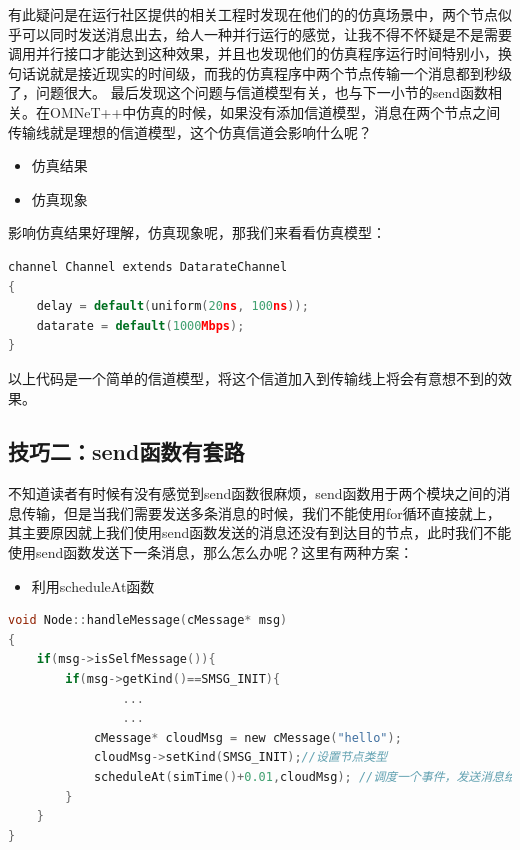 有此疑问是在运行社区提供的相关工程时发现在他们的的仿真场景中，两个节点似乎可以同时发送消息出去，给人一种并行运行的感觉，让我不得不怀疑是不是需要调用并行接口才能达到这种效果，并且也发现他们的仿真程序运行时间特别小，换句话说就是接近现实的时间级，而我的仿真程序中两个节点传输一个消息都到秒级了，问题很大。
最后发现这个问题与信道模型有关，也与下一小节的send函数相关。在OMNeT++中仿真的时候，如果没有添加信道模型，消息在两个节点之间传输线就是理想的信道模型，这个仿真信道会影响什么呢？

\begin{itemize}
\item 仿真结果

\item 仿真现象

\end{itemize}

影响仿真结果好理解，仿真现象呢，那我们来看看仿真模型：

\begin{lstlisting}[language=c]
channel Channel extends DatarateChannel
{
    delay = default(uniform(20ns, 100ns));
    datarate = default(1000Mbps);
}
\end{lstlisting}

以上代码是一个简单的信道模型，将这个信道加入到传输线上将会有意想不到的效果。

\subsection{技巧二：send函数有套路}
\label{技巧二：send函数有套路}

不知道读者有时候有没有感觉到send函数很麻烦，send函数用于两个模块之间的消息传输，但是当我们需要发送多条消息的时候，我们不能使用for循环直接就上，其主要原因就上我们使用send函数发送的消息还没有到达目的节点，此时我们不能使用send函数发送下一条消息，那么怎么办呢？这里有两种方案：

\begin{itemize}
\item 利用scheduleAt函数

\end{itemize}

\begin{lstlisting}[language=c]
void Node::handleMessage(cMessage* msg)
{
    if(msg->isSelfMessage()){
        if(msg->getKind()==SMSG_INIT){
                ...
                ...
            cMessage* cloudMsg = new cMessage("hello");
            cloudMsg->setKind(SMSG_INIT);//设置节点类型
            scheduleAt(simTime()+0.01,cloudMsg); //调度一个事件，发送消息给自己
        }
    }
}
\end{lstlisting}

